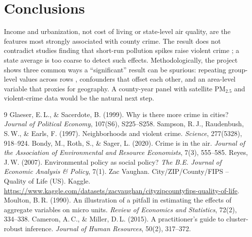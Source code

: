 \documentclass[10pt,letterpaper]{article}
\begin{document}
\section{Conclusions}
Income and urbanization, not cost of living or state-level air quality, are the features most
strongly associated with county crime. The result does not contradict studies finding that
short-run pollution spikes raise violent crime \cite{bondy2020}; a state average is too
coarse to detect such effects. Methodologically, the project shows three common ways a
``significant'' result can be spurious: repeating group-level values across rows
\cite{moulton1990,cameron2015}, confounders that offset each other, and an area-level
variable that proxies for geography. A county-year panel with satellite PM$_{2.5}$ and
violent-crime data would be the natural next step.

\vspace{-4pt}
{\footnotesize
\renewcommand{\refname}{\normalsize References}
\begin{thebibliography}{9}\setlength{\itemsep}{0pt}
 Glaeser, E.\,L., \& Sacerdote, B. (1999). Why is there more crime in
cities? \textit{Journal of Political Economy}, 107(S6), S225--S258.
 Sampson, R.\,J., Raudenbush, S.\,W., \& Earls, F. (1997).
Neighborhoods and violent crime. \textit{Science}, 277(5328), 918--924.
 Bondy, M., Roth, S., \& Sager, L. (2020). Crime is in the air.
\textit{Journal of the Association of Environmental and Resource Economists}, 7(3), 555--585.
 Reyes, J.\,W. (2007). Environmental policy as social policy? \textit{The
B.E. Journal of Economic Analysis \& Policy}, 7(1).
 Zac Vaughan. City/ZIP/County/FIPS -- Quality of Life (US). Kaggle.
\url{https://www.kaggle.com/datasets/zacvaughan/cityzipcountyfips-quality-of-life}.
 Moulton, B.\,R. (1990). An illustration of a pitfall in estimating the
effects of aggregate variables on micro units. \textit{Review of Economics and Statistics},
72(2), 334--338.
 Cameron, A.\,C., \& Miller, D.\,L. (2015). A practitioner's guide to
cluster-robust inference. \textit{Journal of Human Resources}, 50(2), 317--372.
\end{thebibliography}}
\end{document}
